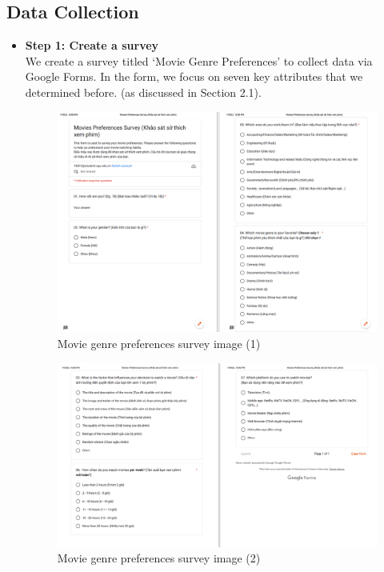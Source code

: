         \subsection{Data Collection}
        \begin{itemize}
            \item \textbf{Step 1: Create a survey}\\
            We create a survey titled ‘Movie Genre Preferences’ to collect data via Google Forms. In the form, we focus on seven key attributes that we determined before. (as discussed in Section 2.1).
            \begin{figure}[H]
                \centering
                \includegraphics[scale=0.5]{graphics/data/Survey1.png}
                \caption{Movie genre preferences survey image (1)}
            \end{figure}
            
            \begin{figure}[H]
                \centering
                \includegraphics[scale=0.5]{graphics/data/Survey2.png}
                \caption{Movie genre preferences survey image (2)}
            \end{figure}
            

\end{itemize}
